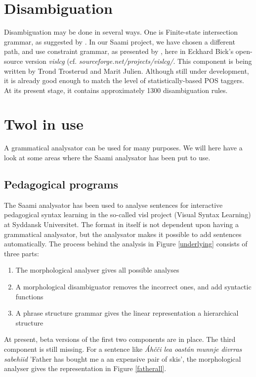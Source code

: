 \documentclass[a4paper,english]{article}
\begin{document}
\section{Disambiguation}\label{disamb}

Disambiguation may be done in several ways. One is Finite-state intersection grammar, as suggested by \cite{Koskenniemi97}. In our Saami project, we have chosen a different path, and use constraint grammar, as presented by \cite{Tapanainen96}, here in Eckhard Bick's open-source version \textit{vislcg} (cf. \textit{sourceforge.net/projects/vislcg/}. This component is being written by Trond Trosterud and Marit Julien. Although still under development, it is already good enough to match the level of statistically-based POS taggers. At its present stage, it contains approximately 1300 disambiguation rules.


\section{Twol in use}

A grammatical analysator can be used for many purposes. We will here have a look at some areas where the Saami analysator has been put to use.

\subsection{Pedagogical programs}\label{ped}

The Saami analysator has been used to analyse sentences for interactive pedagogical syntax learning in the so-called visl project (Visual Syntax Learning) at Syddansk Universitet. The format in itself is not dependent upon having a grammatical analysator, but the analysator makes it possible to add sentences automatically. The process behind the analysis in Figure \ref{underlying} consists of three parts:

\begin{enumerate}
\item The morphological analyser gives all possible analyses
\item A morphological disambiguator removes the incorrect ones, and add syntactic functions
\item A phrase structure grammar gives the linear representation a hierarchical structure
\end{enumerate}

At present, beta versions of the first two components are in place. The third component is still missing.
For a sentence like \textit{Áhčči lea oastán munnje divrras sabehiid} 'Father has bought me a an expensive pair of skis', the morphological analyser gives the representation in Figure \ref{fatherall}.
\end{document}
